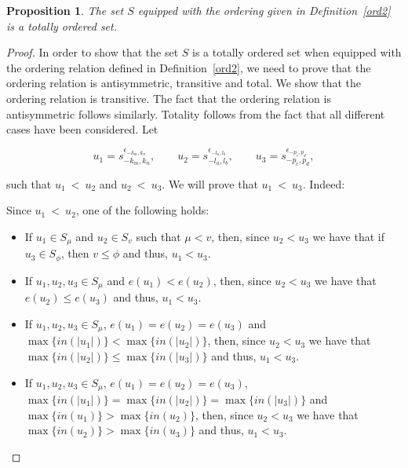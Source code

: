 \documentclass[11pt]{amsart}
\newtheorem{prop}{Proposition}
\begin{document}
\begin{prop}
The set $S$ equipped with the ordering given in Definition~\ref{ord2} is a totally ordered set.
\end{prop}

\begin{proof}
In order to show that the set $S$ is a totally ordered set when equipped with the ordering relation defined in Definition~\ref{ord2}, we need to prove that the ordering relation is antisymmetric, transitive and total. We show that the ordering relation is transitive. The fact that the ordering relation is antisymmetric follows similarly. Totality follows from the fact that all different cases have been considered. Let

\[
u_1=s_{-k_m, k_n}^{\epsilon_{-k_{m}, k_n}},\qquad u_2=s_{-l_a, l_b}^{\epsilon_{-l_a, l_b}},\qquad u_3=s_{-p_c, p_d}^{\epsilon_{-p_c, p_d}},
\]

\noindent such that $u_1\ <\ u_2$ and $u_2\ <\ u_3$. We will prove that $u_1\ <\ u_3$. Indeed:

\smallbreak

 Since $u_1\ <\ u_2$, one of the following holds:

\smallbreak

\begin{itemize}
\item[i.] If $u_1\in S_{\mu}$ and $u_2\in S_{v}$ such that $\mu < v$, then, since $u_2<u_3$ we have that if $u_3\in S_{\phi}$, then $v\leq \phi$ and thus, $u_1<u_3$.

\bigbreak

\item[ii.] If $u_1, u_2, u_3\in S_{\mu}$ and $e(u_1)<e(u_2)$, then, since $u_2<u_3$ we have that $e(u_2) \leq e(u_3)$ and thus, $u_1<u_3$.

\bigbreak

\item[iii.] If $u_1, u_2, u_3\in S_{\mu}$, $e(u_1)=e(u_2)=e(u_3)$ and $\max\{in(|u_1|) \} < \max\{in(|u_2|)\}$, then, since $u_2<u_3$ we have that $\max\{in(|u_2|) \} \leq \max\{in(|u_3|)\}$ and thus, $u_1<u_3$.

\bigbreak

\item[iv.] If $u_1, u_2, u_3\in S_{\mu}$, $e(u_1)=e(u_2)=e(u_3)$, $\max\{in(|u_1|) \} = \max\{in(|u_2|)\} = \max\{in(|u_3|)\}$ and $\max\{in(u_1) \} > \max\{in(u_2)\}$, then, since $u_2<u_3$ we have that $\max\{in(u_2) \} > \max\{in(u_3)\}$ and thus, $u_1<u_3$.

\bigbreak


\end{itemize}
\end{proof}
\end{document}
